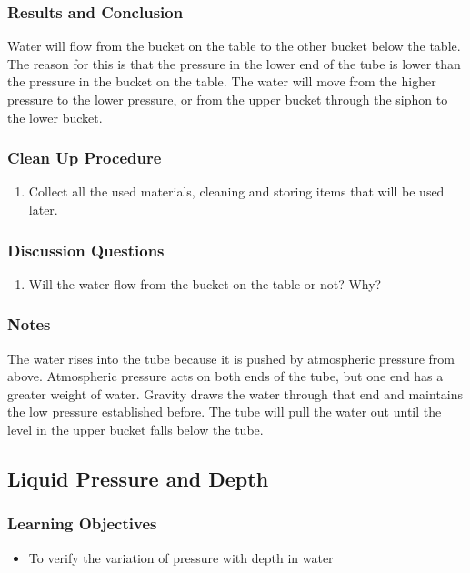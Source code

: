 \subsubsection*{Results and Conclusion}
Water will flow from the bucket on the table to the other bucket below the table. The reason for this is that the pressure in the lower end of the tube is lower than the pressure in the bucket on the table. The water will move from the higher pressure to the lower pressure, or from the upper bucket through the siphon to the lower bucket. 

\subsubsection*{Clean Up Procedure}
\begin{enumerate}
\item{Collect all the used materials, cleaning and storing items that will be used later.} 
\end{enumerate}

\subsubsection*{Discussion Questions}
\begin{enumerate}
\item{Will the water flow from the bucket on the table or not? Why?}
\end{enumerate}

\subsubsection*{Notes}
The water rises into the tube because it is pushed by atmospheric pressure from above. Atmospheric pressure acts on both ends of the tube, but one end has a greater weight of water. Gravity draws the water through that end and maintains the low pressure established before. The tube will pull the water out until the level in the upper bucket falls below the tube. 

\subsection{Liquid Pressure and Depth}

\subsubsection*{Learning Objectives}
\begin{itemize}
\item{To verify the variation of pressure with depth in water} 
\end{itemize}

